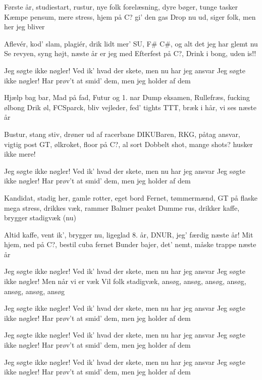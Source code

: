 \documentclass[a4paper,11pt]{article}
\begin{document}
\begin{song}
Første år, studiestart, rustur, nye folk	
forelæsning, dyre bøger, tunge tasker			
Kæmpe pensum, mere stress, hjem på C? gi' den gas		
Drop nu ud, siger folk, men her jeg bliver				

Aflevér, kod' slam, plagiér, drik lidt mer'	
SU, F\# C\#, og alt det jeg har glemt nu	
Se revyen, syng højt, næste år er jeg med	
Efterfest på C?, Drink i bong, uden is!!					

Jeg søgte ikke nøgler!								
Ved ik' hvad der skete, men nu har jeg ansvar				
Jeg søgte ikke nøgler!								
Har prøv't at smid' dem, men jeg holder af dem				

Hjælp bag bar, Mad på fad, Futur og 1. nar		
Dump eksamen, Rullefræs, fucking ølbong	
Drik øl, FCSparck, bliv vejleder, fed' tights	
TTT, bræk i hår, vi ses næste år						

Bustur, stang stiv, drøner ud af racerbane	
DIKUBaren, RKG, påtag ansvar, vigtig post	
GT, ølkroket, floor på C?, al sort	
Dobbelt shot, mange shots? husker ikke mere!				

Jeg søgte ikke nøgler!								
Ved ik' hvad der skete, men nu har jeg ansvar				
Jeg søgte ikke nøgler!								
Har prøv't at smid' dem, men jeg holder af dem				

Kandidat, stadig her, gamle rotter, eget bord		
Fernet, tømmermænd, GT på flaske		
mega stress, drikkes væk, rammer Balmer peaket		
Dumme rus, drikker kaffe, brygger stadigvæk (nu)					

Altid kaffe, vent ik', brygger nu, ligeglad		
8. år, DNUR, jeg' færdig næste år!	
Mit hjem, ned på C?, bestil cuba fernet		
Bunder bajer, det' nemt, måske trappe næste år				


 Jeg søgte ikke nøgler!								
Ved ik' hvad der skete, men nu har jeg ansvar				
Jeg søgte ikke nøgler!								
Men når vi er væk									
Vil folk stadigvæk, ansøg, ansøg, ansøg, ansøg, ansøg,		
ansøg, ansøg									

Jeg søgte ikke nøgler!								
Ved ik' hvad der skete, men nu har jeg ansvar				
Jeg søgte ikke nøgler!								
Har prøv't at smid' dem, men jeg holder af dem	

Jeg søgte ikke nøgler!								
Ved ik' hvad der skete, men nu har jeg ansvar				
Jeg søgte ikke nøgler!								
Har prøv't at smid' dem, men jeg holder af dem	
								
Jeg søgte ikke nøgler!								
Ved ik' hvad der skete, men nu har jeg ansvar				
Jeg søgte ikke nøgler!					
Har prøv't at smid' dem, men jeg holder af dem	

\end{song}
\end{document}
